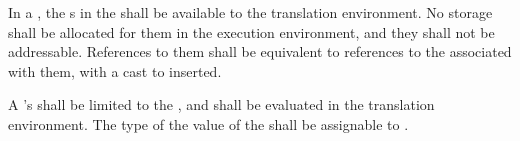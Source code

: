 \specsubsubitem
In a , the s in the
 shall be available to the translation
environment. No storage shall be allocated for them in the execution
environment, and they shall not be addressable. References to them shall be
equivalent to references to the  associated with them,
with a cast to  inserted.

\specsubsubitem
A 's  shall be limited to
the , and shall be evaluated
in the translation environment. The type of the value of the
 shall be assignable to .


\begin{grammar}
 \\
	  \\

 \\
	 \optional{\terminal{,}} \\
	 \terminal{,}  \\

 \\
	 \terminal{=}  \\
	 \terminal{=}  \\

 \\
	  \terminal{\{}  \terminal{\}} \\

 \\
	 \optional{\terminal{,}} \\
	 \terminal{,}  \\

 \\
	 \\
	 \terminal{=}  \\

 \\
	 \\
	 \\

\end{grammar}

